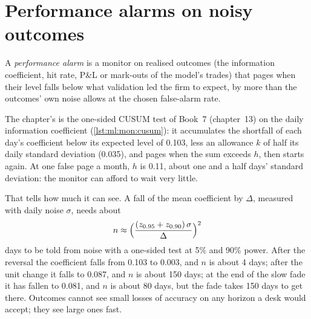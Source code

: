 \section{Performance alarms on noisy outcomes}

\begin{definition}\label{def:ml:monitoring-and-retraining:performance-alarm}
A \emph{performance alarm} is a monitor on realised outcomes (the information coefficient, hit rate,
P\&L or mark-outs of the model's trades) that pages when their level falls below what validation led the firm to expect, by more
than the outcomes' own noise allows at the chosen false-alarm rate.
\end{definition}

The chapter's  is the one-sided CUSUM test of Book~7 (chapter~13) on the daily information coefficient
(\cref{lst:ml:mon:cusum}): it accumulates the shortfall of each day's coefficient below its expected level of 0.103, less an
allowance $k$ of half its daily standard deviation (0.035), and pages when the sum exceeds $h$, then starts again. At one false
page a month, $h$ is 0.11, about one and a half days' standard deviation: the monitor can afford to wait very little.

That tells how much it can see. A fall of the mean coefficient by $\Delta$, measured with daily noise $\sigma$, needs about
\[
n\approx\Bigl(\frac{(z_{0.95}+z_{0.90})\,\sigma}{\Delta}\Bigr)^2
\]
days to be told from noise with a one-sided test at 5\% and 90\% power. After the reversal the coefficient falls from 0.103 to
0.003, and $n$ is about 4 days; after the unit change it falls to 0.087, and $n$ is about 150 days; at the end of the slow fade it
has fallen to 0.081, and $n$ is about 80 days, but the fade takes 150 days to get there. Outcomes cannot see small losses of
accuracy on any horizon a desk would accept; they see large ones fast.

